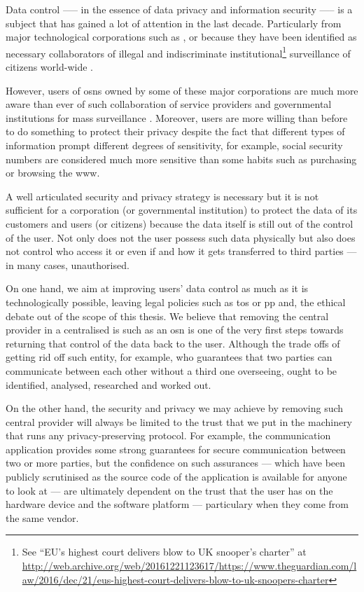 Data control —-- in the essence of data privacy and information security —-- is a 
subject that has gained a lot of attention in the last decade. Particularly from 
major technological corporations such as \Google, \Apple or \Facebook because they 
have been identified as necessary collaborators of illegal and indiscriminate institutional\footnote{See 
``EU's highest court delivers blow to UK snooper's charter'' at \url{http://web.archive.org/web/20161221123617/https://www.theguardian.com/law/2016/dec/21/eus-highest-court-delivers-blow-to-uk-snoopers-charter}} 
surveillance of citizens world-wide \cite{Lyon14}.

However, users of \acp{osn} owned by some of these major corporations are much more 
aware than ever of such collaboration of service providers and governmental institutions 
for mass surveillance \cite{Madden14}. Moreover, users are more willing than before 
to do something to protect their privacy despite the fact that different types of 
information prompt different degrees of sensitivity, for example, social security 
numbers are considered much more sensitive than some habits such as purchasing or 
browsing the \ac{www}.

A well articulated security and privacy strategy is necessary but it is not sufficient 
for a corporation (or governmental institution) to protect the data of its customers 
and users (or citizens) because the data itself is still out of the control of the 
user. Not only does not the user possess such data physically but also does not 
control who access it or even if and how it gets transferred to third parties --- 
in many cases, unauthorised.

On one hand, we aim at improving users' data control as much as it is technologically possible, 
leaving legal policies such as \ac{tos} or \ac{pp} and, the ethical debate out of 
the scope of this thesis. We believe that removing the central provider in a centralised 
\ac{is} such as an \ac{osn} is one of the very first steps towards returning that 
control of the data back to the user. Although the trade offs of getting rid off 
such entity, for example, who guarantees that two parties can communicate between 
each other without a third one overseeing, ought to be identified, analysed, researched 
and worked out.

On the other hand, the security and privacy we may achieve by removing such central 
provider will always be limited to the trust that we put in the machinery that runs 
any privacy-preserving protocol. For example, the communication application \Signal 
provides some strong guarantees for secure communication between two or more parties, 
but the confidence on such assurances --- which have been publicly scrutinised as 
the source code of the application is available for anyone to look at --- are ultimately 
dependent on the trust that the user has on the hardware device and the software platform 
--- particulary when they come from the same vendor.

